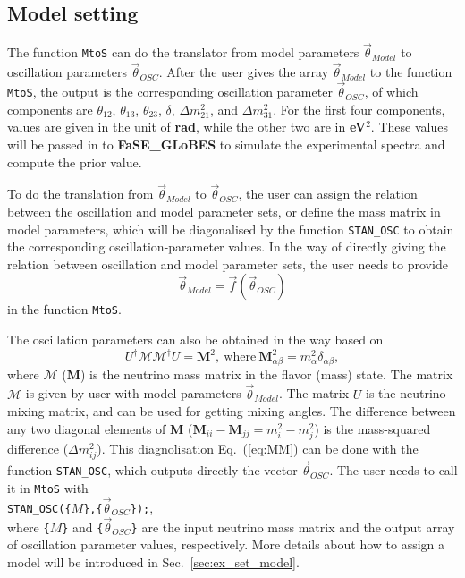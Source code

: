 \documentclass[aps,prd,nofootinbib,preprint]{revtex4}
\begin{document}
\subsection{Model setting}\label{sec:model_set}

The function \texttt{MtoS} can do the translator from model parameters $\vec{\theta}_{Model}$ to oscillation parameters $\vec{\theta}_{OSC}$. After the user gives the array $\vec{\theta}_{Model}$ to the function \texttt{MtoS}, the output is the corresponding oscillation parameter $\vec{\theta}_{OSC}$, of which components are $\theta_{12}$, $\theta_{13}$, $\theta_{23}$, $\delta$, $\Delta m_{21}^2$, and $\Delta m_{31}^2$. For the first four components, values are given in the unit of \textbf{rad}, while the other two are in \textbf{eV$^2$}. These values will be passed in to \textbf{FaSE\_GLoBES} to simulate 
the experimental spectra and compute the prior value.


To do the translation from $\vec{\theta}_{Model}$ to $\vec{\theta}_{OSC}$, the user can assign the relation between the oscillation and model parameter sets, or define the mass matrix in model parameters, which will be diagonalised by the function \texttt{STAN\_OSC} to obtain the corresponding oscillation-parameter values. 
In the way of directly giving the relation between oscillation and model parameter sets, the user needs to provide
\begin{equation}\label{eq:modelofOSC}
\vec{\theta}_{Model}=\vec{f}(\vec{\theta}_{OSC})
\end{equation}
 in the function \texttt{MtoS}.
%

The oscillation parameters can also be obtained in the way based on
\begin{equation}\label{eq:MM}
U^\dagger\mathcal{M}\mathcal{M}^\dagger U = \mathbf{M}^2,~\text{where}~\mathbf{M}^2_{\alpha\beta}=m_\alpha^2\delta_{\alpha\beta},
\end{equation}
where $\mathcal{M}$ ($\mathbf{M}$) is the neutrino mass matrix in the flavor (mass) state. The matrix $\mathcal{M}$ is given by user with model parameters $\vec{\theta}_{Model}$. The matrix $U$ is the neutrino mixing matrix, and can be used for getting mixing angles. The difference between any two diagonal elements of $\textbf{M}$ ($\textbf{M}_{ii}-\textbf{M}_{jj}=m_i^2-m_j^2$) is the mass-squared difference ($\Delta m_{ij}^2$). This diagnolisation Eq.~(\ref{eq:MM}) can be done with the function \texttt{STAN\_OSC}, which outputs directly the vector $\vec{\theta}_{OSC}$. 
The user needs to call it in \texttt{MtoS} with\vspace{0.2cm}\\
\texttt{STAN\_OSC(\{}$M$\texttt{\},\{}$\vec{\theta}_{OSC}$\texttt{\});},\\
where \texttt{\{}$M$\texttt{\}} and \texttt{\{}$\vec{\theta}_{OSC}$\texttt{\}} are the input neutrino mass matrix and the output array of oscillation parameter values, respectively. More details about how to assign a model will be introduced in Sec.~\ref{sec:ex_set_model}.
\end{document}
